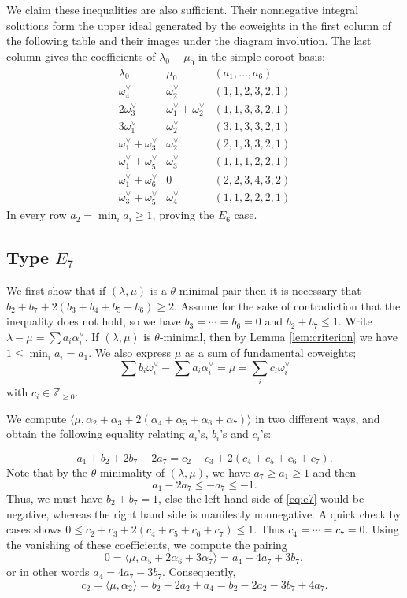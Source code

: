 \documentclass[a4paper, 12pt]{amsart}
\theoremstyle{definition}
\begin{document}
We claim these inequalities are also sufficient. Their nonnegative integral solutions form the upper ideal generated by the coweights in the first column of the following table and their images under the diagram involution. The last column gives the coefficients of $\lambda_0-\mu_0$ in the simple-coroot basis:
\[
\begin{array}{c|c|c}
\lambda_0&\mu_0&(a_1,\ldots,a_6)\\ \hline
\omega_4^\vee&\omega_2^\vee&(1,1,2,3,2,1)\\
2\omega_3^\vee&\omega_1^\vee+\omega_2^\vee&(1,1,3,3,2,1)\\
3\omega_1^\vee&\omega_2^\vee&(3,1,3,3,2,1)\\
\omega_1^\vee+\omega_3^\vee&\omega_2^\vee&(2,1,3,3,2,1)\\
\omega_1^\vee+\omega_5^\vee&\omega_3^\vee&(1,1,1,2,2,1)\\
\omega_1^\vee+\omega_6^\vee&0&(2,2,3,4,3,2)\\
\omega_3^\vee+\omega_5^\vee&\omega_4^\vee&(1,1,2,2,2,1)
\end{array}
\]
In every row $a_2=\min_i a_i\ge1$, proving the $E_6$ case.

\subsection{Type $E_7$} We first show that if $(\lambda, \mu)$ is a $\theta$-minimal pair then it is necessary that $b_2+b_7+2(b_3+b_4+b_5+b_6) \geq 2$. Assume for the sake of contradiction that the inequality does not hold, so we have $b_3=\cdots=b_6=0$ and $b_2+b_7\le1$. Write $\lambda-\mu = \sum a_i \alpha_i^{\vee}$. If $(\lambda, \mu)$ is $\theta$-minimal, then by Lemma \ref{lem:criterion} we have $1 \leq \min_i a_i = a_1$.
We also express $\mu$ as a sum of fundamental coweights; 
\[\sum b_i \omega_i^{\vee}-\sum a_i \alpha_i^{\vee}=\mu=\sum_i c_i\omega_i^\vee\] with $c_i\in\mathbb Z_{\ge0}.$

We compute $\langle \mu, \alpha_2+\alpha_3+2(\alpha_4+\alpha_5+\alpha_6+\alpha_7) \rangle$ in two different ways, and obtain the following equality relating $a_i$'s, $b_i$'s and $c_i$'s:
 
\begin{equation}
a_1+b_2+2b_7-2a_7=c_2+c_3+2(c_4+c_5+c_6+c_7).
\label{eq:e7}
\end{equation}
Note that by the $\theta$-minimality of $(\lambda, \mu)$, we have $a_7\ge a_1\geq 1$ and then 
$$a_1-2a_7\leq -a_7 \leq -1.$$ Thus, we must have $b_2+b_7=1$, else the left hand side of \eqref{eq:e7} would be negative, whereas the right hand side is manifestly nonnegative. 
 A quick check by cases shows
$0\le c_2+c_3+2(c_4+c_5+c_6+c_7) \le1$. Thus $c_4=\cdots=c_7=0$. Using the vanishing of these coefficients, we compute the pairing \[0=\langle \mu, \alpha_5+2\alpha_6+3\alpha_7 \rangle = a_4-4a_7+3b_7,\]
or in other words $a_4=4a_7-3b_7$. Consequently,
\begin{equation}
	c_2=\langle \mu, \alpha_2 \rangle = b_2-2a_2+a_4=b_2-2a_2-3b_7+4a_7.
	\label{eq:e7-2}
\end{equation}
\end{document}
